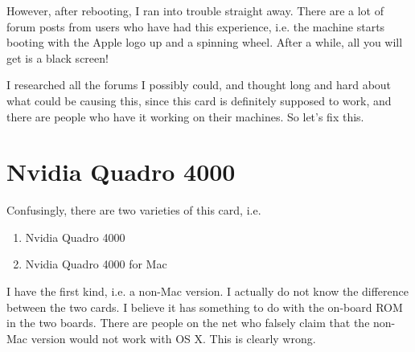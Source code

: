 \documentclass[11pt]{article}
\begin{document}
However, after rebooting, I ran into trouble straight away.  There are a lot of forum posts from users who have had this experience, i.e. the machine starts booting with the Apple logo up and a spinning wheel.  After a while, all you will get is a black screen!

I researched all the forums I possibly could, and thought long and hard about what could be causing this, since this card is definitely supposed to work, and there are people who have it working on their machines.   So let's fix this.

\section{Nvidia Quadro 4000}

Confusingly, there are two varieties of this card, i.e.
\begin{enumerate}
\item Nvidia Quadro 4000
\item Nvidia Quadro 4000 for Mac
\end{enumerate}
I have the first kind, i.e. a non-Mac version.  I actually do not know the difference between the two cards. I believe it has something to do with the on-board ROM in the two boards.  There are people on the net who falsely claim that the non-Mac version would not work with OS X.  This is clearly wrong.
\end{document}
